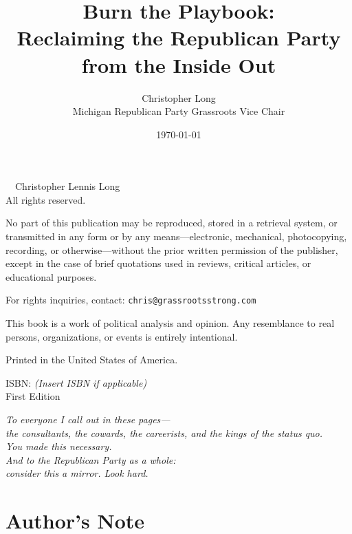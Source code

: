 \documentclass[12pt]{book}
\title{Burn the Playbook: \\Reclaiming the Republican Party from the Inside Out}
\author{Christopher Long\\Michigan Republican Party Grassroots Vice Chair}
\date{\today}
\begin{document}
\setcounter{secnumdepth}{0}
\maketitle




\newpage
\thispagestyle{empty}
\vspace*{4cm}
\begin{center}
    \textcopyright\ \the\year\ Christopher Lennis Long \\
    All rights reserved.
\end{center}

\vspace{1cm}

No part of this publication may be reproduced, stored in a retrieval system, or transmitted in any form or by any means—electronic, mechanical, photocopying, recording, or otherwise—without the prior written permission of the publisher, except in the case of brief quotations used in reviews, critical articles, or educational purposes.

For rights inquiries, contact: \texttt{chris@grassrootsstrong.com}

This book is a work of political analysis and opinion. Any resemblance to real persons, organizations, or events is entirely intentional.

Printed in the United States of America.

\vfill
ISBN: \textit{(Insert ISBN if applicable)} \\
First Edition

\newpage
\thispagestyle{empty}
\vspace*{6cm}
\begin{center}
    \emph{To everyone I call out in these pages—} \\
    \emph{the consultants, the cowards, the careerists, and the kings of the status quo.} \\
    \emph{You made this necessary.} \\
    \vspace{0.5cm}
    \emph{And to the Republican Party as a whole:} \\
    \emph{consider this a mirror. Look hard.}
\end{center}


\chapter*{Author's Note}
\end{document}
